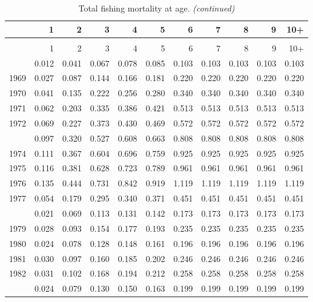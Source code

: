\documentclass[
]{article}
\begin{document}
\begin{longtable}[t]{lrrrrrrrrrr}
\caption{\label{tab:FAA-tot-table}Total fishing mortality at age.}\\
\toprule
  & 1 & 2 & 3 & 4 & 5 & 6 & 7 & 8 & 9 & 10+\\
\midrule
\endfirsthead
\caption[]{Total fishing mortality at age. \textit{(continued)}}\\
\toprule
  & 1 & 2 & 3 & 4 & 5 & 6 & 7 & 8 & 9 & 10+\\
\midrule
\endhead

\endfoot
\bottomrule
\endlastfoot
1968 & 0.012 & 0.041 & 0.067 & 0.078 & 0.085 & 0.103 & 0.103 & 0.103 & 0.103 & 0.103\\
1969 & 0.027 & 0.087 & 0.144 & 0.166 & 0.181 & 0.220 & 0.220 & 0.220 & 0.220 & 0.220\\
1970 & 0.041 & 0.135 & 0.222 & 0.256 & 0.280 & 0.340 & 0.340 & 0.340 & 0.340 & 0.340\\
1971 & 0.062 & 0.203 & 0.335 & 0.386 & 0.421 & 0.513 & 0.513 & 0.513 & 0.513 & 0.513\\
1972 & 0.069 & 0.227 & 0.373 & 0.430 & 0.469 & 0.572 & 0.572 & 0.572 & 0.572 & 0.572\\
\addlinespace
1973 & 0.097 & 0.320 & 0.527 & 0.608 & 0.663 & 0.808 & 0.808 & 0.808 & 0.808 & 0.808\\
1974 & 0.111 & 0.367 & 0.604 & 0.696 & 0.759 & 0.925 & 0.925 & 0.925 & 0.925 & 0.925\\
1975 & 0.116 & 0.381 & 0.628 & 0.723 & 0.789 & 0.961 & 0.961 & 0.961 & 0.961 & 0.961\\
1976 & 0.135 & 0.444 & 0.731 & 0.842 & 0.919 & 1.119 & 1.119 & 1.119 & 1.119 & 1.119\\
1977 & 0.054 & 0.179 & 0.295 & 0.340 & 0.371 & 0.451 & 0.451 & 0.451 & 0.451 & 0.451\\
\addlinespace
1978 & 0.021 & 0.069 & 0.113 & 0.131 & 0.142 & 0.173 & 0.173 & 0.173 & 0.173 & 0.173\\
1979 & 0.028 & 0.093 & 0.154 & 0.177 & 0.193 & 0.235 & 0.235 & 0.235 & 0.235 & 0.235\\
1980 & 0.024 & 0.078 & 0.128 & 0.148 & 0.161 & 0.196 & 0.196 & 0.196 & 0.196 & 0.196\\
1981 & 0.030 & 0.097 & 0.160 & 0.185 & 0.202 & 0.246 & 0.246 & 0.246 & 0.246 & 0.246\\
1982 & 0.031 & 0.102 & 0.168 & 0.194 & 0.212 & 0.258 & 0.258 & 0.258 & 0.258 & 0.258\\
\addlinespace
1983 & 0.024 & 0.079 & 0.130 & 0.150 & 0.163 & 0.199 & 0.199 & 0.199 & 0.199 & 0.199\\

\end{longtable}
\end{document}
